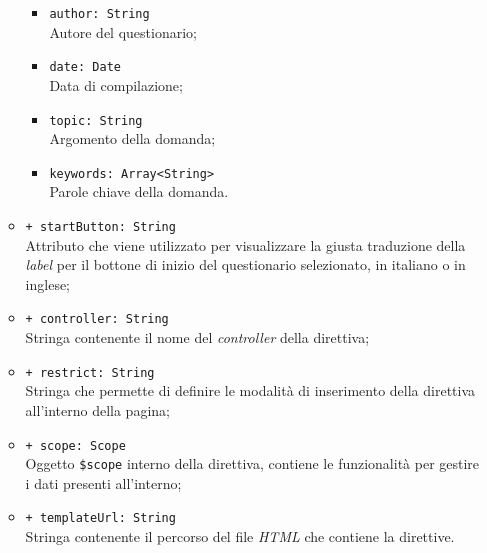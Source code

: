 \begin{itemize}
\begin{itemize}
\begin{itemize}
					\item \texttt{author: String} \\ Autore del questionario;
					\item \texttt{date: Date} \\ Data di compilazione;
					\item \texttt{topic: String} \\ Argomento della domanda;
					\item \texttt{keywords: Array<String>} \\ Parole chiave della domanda.
				\end{itemize}
				\item \texttt{+ startButton: String} \\ Attributo che viene utilizzato per visualizzare la giusta traduzione della \textit{label} per il bottone di inizio del questionario selezionato, in italiano o in inglese; 
				\item \texttt{+ controller: String} \\ Stringa contenente il nome del \textit{controller} della direttiva;
				\item \texttt{+ restrict: String} \\ Stringa che permette di definire le modalità di inserimento della direttiva all'interno della pagina;
				\item \texttt{+ scope: Scope} \\Oggetto \texttt{\$scope} interno della direttiva, contiene le funzionalità per gestire i dati presenti all'interno;
				\item \texttt{+ templateUrl: String} \\ Stringa contenente il percorso del file \textit{HTML} che contiene la direttive.
			\end{itemize}
		\end{itemize}
		